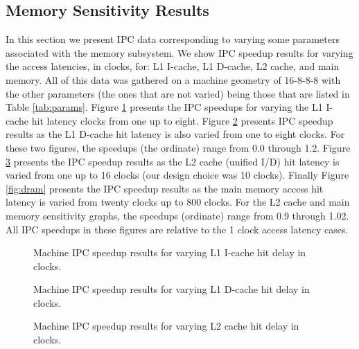 \documentclass[10pt,twocolumn,dvips]{article}
\begin{document}
\subsection{Memory Sensitivity Results}
%
In this section we present IPC data corresponding to varying some
parameters associated with the memory subsystem.
We show IPC speedup results for varying the access latencies,
in clocks, for: L1 I-cache,
L1 D-cache,
L2 cache, and
main memory.
All of this data was gathered on a machine geometry 
of 16-8-8-8 with the other parameters (the ones that are
not varied) being those that are listed in Table \ref{tab:params}.
Figure \ref{fig:l1icache} presents the IPC speedups for varying
the L1 I-cache hit latency clocks from one up to eight.
Figure \ref{fig:l1dcache} presents IPC speedup results
as the L1 D-cache hit latency is also varied from one to eight clocks.
For these two figures, the speedups (the ordinate)
range from 0.0 through 1.2.
Figure \ref{fig:l2cache} presents the IPC speedup results
as the L2 cache (unified I/D) hit latency is varied from 
one up to 16 clocks (our design choice was 10 clocks).
Finally Figure \ref{fig:dram} presents the IPC speedup results
as the main memory access hit latency is varied from twenty clocks 
up to 800 clocks.
For the L2 cache and main memory sensitivity graphs, the speedups
(ordinate) range from 0.9 through 1.02.
All IPC speedups in these figures are relative to the 1 clock
access latency cases.  
%
\begin{figure}
\centering
{}
\caption{Machine IPC speedup results for varying 
L1 I-cache hit delay in clocks.}
\label{fig:l1icache}
\end{figure}
%
\begin{figure}
\centering
{}
\caption{Machine IPC speedup results for varying 
L1 D-cache hit delay in clocks.}
\label{fig:l1dcache}
\end{figure}
%
\begin{figure}
\centering
{}
\caption{Machine IPC speedup results for varying 
L2 cache hit delay in clocks.}
\label{fig:l2cache}
\end{figure}
\end{document}
